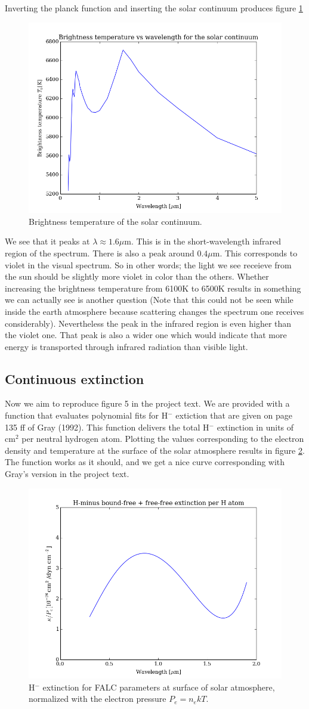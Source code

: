 \documentclass{aa}   %
\begin{document}
Inverting the planck function and inserting the solar continuum produces figure \ref{planck_invert}
\begin{figure}
 \includegraphics[width=.49\textwidth]{planck_invert.png}
 \caption{Brightness temperature of the solar continuum.}
 \label{planck_invert} 
\end{figure}
We see that it peaks at $\lambda \approx 1.6 \mu$m.
This is in the short-wavelength infrared region of the spectrum. There is also a peak around $0.4 \mu$m. This corresponds to violet in the visual spectrum. So in other words; the light we see receieve from the sun should be slightly more violet in color than the others. Whether increasing the brightness temperature from 6100K to 6500K results in something we can actually see is another question (Note that this could not be seen while inside the earth atmosphere because scattering changes the spectrum one receives considerably). Nevertheless the peak in the infrared region is even higher than the violet one. That peak is also a wider one which would indicate that more energy is transported through infrared radiation than visible light.
\subsection{Continuous extinction}
Now we aim to reproduce figure 5 in the project text. We are provided with a function that evaluates polynomial fits for H$^-$ extiction that are given on page 135 ff of Gray (1992). This function delivers the total H$^-$ extinction in units of cm$^2$ per neutral hydrogen atom. Plotting the values corresponding to the electron density and temperature at the surface of the solar atmosphere results in figure \ref{extinction}. The function works as it should, and we get a nice curve corresponding with Gray's version in the project text.
\begin{figure}
 \includegraphics[width=.49\textwidth]{extinction.png}
 \caption{H$^-$ extinction for FALC parameters at surface of solar atmosphere, normalized with the electron pressure $P_e =n_e kT$.}
 \label{extinction} 
\end{figure}
\end{document}

